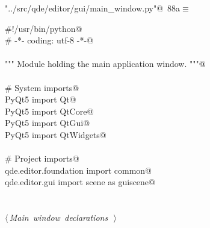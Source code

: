 \documentclass[
    a4paper,      %
    10pt,         %
    openright,    %
    notitlepage,  %
    parskip=half, %
]{scrreprt}       %
\theoremstyle{definition}                    %
\begin{document}
\begin{flushleft} \small
\begin{minipage}{\linewidth}\label{scrap138}\raggedright\small
{} \verb@"../src/qde/editor/gui/main_window.py"@\nobreak\ {\footnotesize {88a}}$\equiv$
\vspace{-1ex}
\begin{list}{}{} \item
\mbox{}\lstinline@#!/usr/bin/python@\\
\mbox{}\lstinline@# -*- coding: utf-8 -*-@\\
\mbox{}\lstinline@@\\
\mbox{}\lstinline@""" Module holding the main application window. """@\\
\mbox{}\lstinline@@\\
\mbox{}\lstinline@# System imports@\\
\mbox{}\lstinline@from PyQt5 import Qt@\\
\mbox{}\lstinline@from PyQt5 import QtCore@\\
\mbox{}\lstinline@from PyQt5 import QtGui@\\
\mbox{}\lstinline@from PyQt5 import QtWidgets@\\
\mbox{}\lstinline@@\\
\mbox{}\lstinline@# Project imports@\\
\mbox{}\lstinline@from qde.editor.foundation import common@\\
\mbox{}\lstinline@from qde.editor.gui import scene as guiscene@\\
\mbox{}\lstinline@@\\
\mbox{}\lstinline@@\\
\mbox{}\lstinline@@\hbox{$\langle\,${\itshape Main window declarations}\nobreak\ {\footnotesize {}}$\,\rangle$}\lstinline@@\\
\mbox{}\lstinline@@{\NWsep}
\end{list}
\vspace{-1.5ex}
\footnotesize
\begin{list}{}{\setlength{\itemsep}{-\parsep}\setlength{\itemindent}{-\leftmargin}}

\item{}
\end{list}
\end{minipage}\vspace{4ex}
\end{flushleft}
\end{document}

